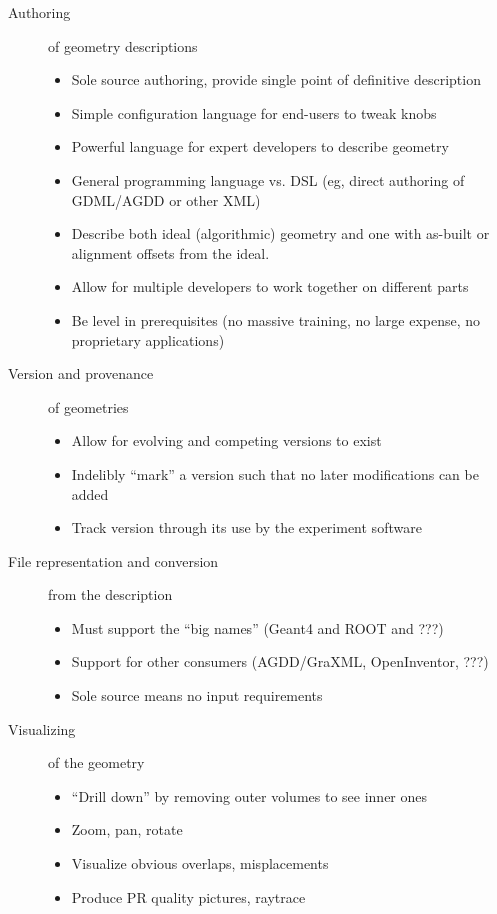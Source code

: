 \begin{description}
\item[Authoring] of geometry descriptions
  \begin{itemize}
  \item Sole source authoring, provide single point of definitive description
  \item Simple configuration language for end-users to tweak knobs
  \item Powerful language for expert developers to describe geometry
  \item General programming language vs. DSL (eg, direct authoring of GDML/AGDD or other XML)
  \item Describe both ideal (algorithmic) geometry and one with as-built or alignment offsets from the ideal.
  \item Allow for multiple developers to work together on different parts
  \item Be level in prerequisites (no massive training, no large expense, no proprietary applications)
  \end{itemize}
\item[Version and provenance] of geometries
  \begin{itemize}
  \item Allow for evolving and competing versions to exist
  \item Indelibly ``mark'' a version such that no later modifications can be added
  \item Track version through its use by the experiment software
  \end{itemize}
\item[File representation and conversion] from the description
  \begin{itemize}
  \item Must support the ``big names'' (Geant4 and ROOT and ???)
  \item Support for other consumers (AGDD/GraXML, OpenInventor, ???)
  \item Sole source means no input requirements
  \end{itemize}
\item[Visualizing] of the geometry
  \begin{itemize}
  \item ``Drill down'' by removing outer volumes to see inner ones
  \item Zoom, pan, rotate
  \item Visualize obvious overlaps, misplacements
  \item Produce PR quality pictures, raytrace

\end{itemize}
\end{description}
